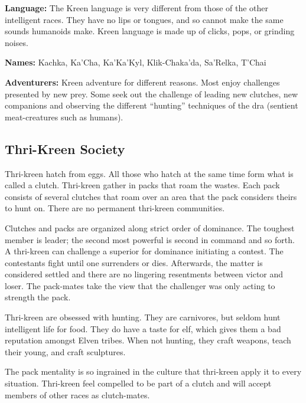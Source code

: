 \textbf{Language:} The Kreen language is very different from those of the other intelligent races. They have no lips or tongues, and so cannot make the same sounds humanoids make. Kreen language is made up of clicks, pops, or grinding noises.

\textbf{Names:} Kachka, Ka'Cha, Ka'Ka'Kyl, Klik-Chaka'da, Sa'Relka, T'Chai

\textbf{Adventurers:} Kreen adventure for different reasons. Most enjoy challenges presented by new prey. Some seek out the challenge of leading new clutches, new companions and observing the different ``hunting'' techniques of the dra (sentient meat-creatures such as humans).

\subsection{Thri-Kreen Society}
Thri-kreen hatch from eggs. All those who hatch at the same time form what is called a clutch. Thri-kreen gather in packs that roam the wastes. Each pack consists of several clutches that roam over an area that the pack considers theirs to hunt on. There are no permanent thri-kreen communities.

Clutches and packs are organized along strict order of dominance. The toughest member is leader; the second most powerful is second in command and so forth. A thri-kreen can challenge a superior for dominance initiating a contest. The contestants fight until one surrenders or dies. Afterwards, the matter is considered settled and there are no lingering resentments between victor and loser. The pack-mates take the view that the challenger was only acting to strength the pack.

Thri-kreen are obsessed with hunting. They are carnivores, but seldom hunt intelligent life for food. They do have a taste for elf, which gives them a bad reputation amongst Elven tribes. When not hunting, they craft weapons, teach their young, and craft sculptures.

The pack mentality is so ingrained in the culture that thri-kreen apply it to every situation. Thri-kreen feel compelled to be part of a clutch and will accept members of other races as clutch-mates.

